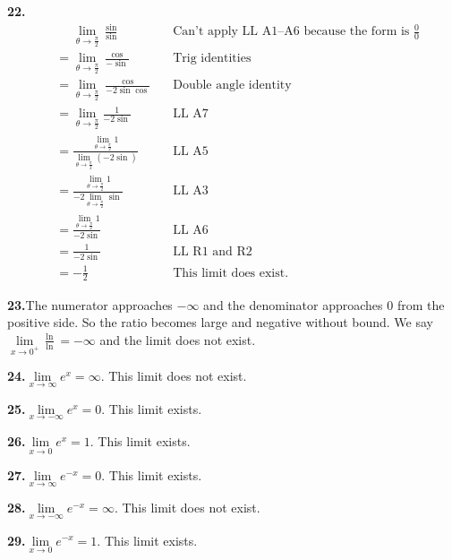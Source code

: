 \documentclass[12pt,]{book}
\theoremstyle{plain}
\theoremstyle{definition}
\numberwithin{equation}{section}
\newcommand{\fe}[2]{\mathop{{#1}{\left(#2\right)}}}
\begin{document}
\noindent\textbf{22.}\quad{}\begin{align*}
&\phantom{={}}\lim\limits_{\theta\to\frac{\pi}{2}}\frac{\fe{\sin}{\theta+\frac{\pi}{2}}}{\fe{\sin}{2\theta+\pi}}&&\text{Can't apply LL A1--A6 because the form is $\tfrac{0}{0}$}\\
&=\lim\limits_{\theta\to\frac{\pi}{2}}\frac{\fe{\cos}{\theta}}{-\fe{\sin}{2\theta}}&&\text{Trig identities}\\
&=\lim\limits_{\theta\to\frac{\pi}{2}}\frac{\fe{\cos}{\theta}}{-2\fe{\sin}{\theta}\fe{\cos}{\theta}}&&\text{Double angle identity}\\
&=\lim\limits_{\theta\to\frac{\pi}{2}}\frac{1}{-2\fe{\sin}{\theta}}&&\text{LL A7}\\
&=\frac{\lim\limits_{\theta\to\frac{\pi}{2}}1}{\lim\limits_{\theta\to\frac{\pi}{2}}\left(-2\fe{\sin}{\theta}\right)}&&\text{LL A5}\\
&=\frac{\lim\limits_{\theta\to\frac{\pi}{2}}1}{-2\lim\limits_{\theta\to\frac{\pi}{2}}\fe{\sin}{\theta}}&&\text{LL A3}\\
&=\frac{\lim\limits_{\theta\to\frac{\pi}{2}}1}{-2\fe{\sin}{\lim\limits_{\theta\to\frac{\pi}{2}}\theta}}&&\text{LL A6}\\
&=\frac{1}{-2\fe{\sin}{\frac{\pi}{2}}}&&\text{LL R1 and R2}\\
&=-\frac{1}{2}&&\text{This limit does exist.}
\end{align*}%
\par\smallskip
\noindent\textbf{23.}\quad{}The numerator approaches \(-\infty\) and the denominator approaches \(0\) from the positive side. So the ratio becomes large and negative without bound. We say \(\lim\limits_{x\to0^{+}}\frac{\fe{\ln}{x^e}}{\fe{\ln}{e^x}}=-\infty\) and the limit does not exist.%
\par\smallskip
\noindent\textbf{24.}\quad{}\(\lim\limits_{x\to\infty}e^x=\infty\). This limit does not exist.%
\par\smallskip
\noindent\textbf{25.}\quad{}\(\lim\limits_{x\to-\infty}e^x=0\). This limit exists.%
\par\smallskip
\noindent\textbf{26.}\quad{}\(\lim\limits_{x\to0}e^x=1\). This limit exists.%
\par\smallskip
\noindent\textbf{27.}\quad{}\(\lim\limits_{x\to\infty}e^{-x}=0\). This limit exists.%
\par\smallskip
\noindent\textbf{28.}\quad{}\(\lim\limits_{x\to-\infty}e^{-x}=\infty\). This limit does not exist.%
\par\smallskip
\noindent\textbf{29.}\quad{}\(\lim\limits_{x\to0}e^{-x}=1\). This limit exists.%
\end{document}
